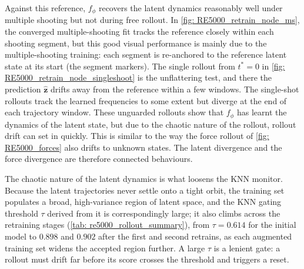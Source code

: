 Against this reference, $f_\phi$ recovers the latent dynamics reasonably well under multiple shooting but not during free rollout. In \autoref{fig: RE5000_retrain_node_ms}, the converged multiple-shooting fit tracks the reference closely within each shooting segment, but this good visual performance is mainly due to the multiple-shooting training: each segment is re-anchored to the reference latent state at its start (the segment markers). The single rollout from $t^*=0$ in \autoref{fig: RE5000_retrain_node_singleshoot} is the unflattering test, and there the prediction $\hat{\mathbf{z}}$ drifts away from the reference within a few windows. The single-shot rollouts track the learned frequencies to some extent but diverge at the end of each trajectory window. These unguarded rollouts show that $f_\phi$ has learnt the dynamics of the latent state, but due to the chaotic nature of the rollout, rollout drift can set in quickly. This is similar to the way the force rollout of \autoref{fig: RE5000_forces} also drifts to unknown states. The latent divergence and the force divergence are therefore connected behaviours.

The chaotic nature of the latent dynamics is what loosens the KNN monitor. Because the latent trajectories never settle onto a tight orbit, the training set populates a broad, high-variance region of latent space, and the KNN gating threshold $\tau$ derived from it is correspondingly large; it also climbs across the retraining stages (\autoref{tab: re5000_rollout_summary}), from $\tau=0.614$ for the initial model to $0.898$ and $0.902$ after the first and second retrains, as each augmented training set widens the accepted region further.  A large $\tau$ is a lenient gate: a rollout must drift far before its score crosses the threshold and triggers a reset. 

